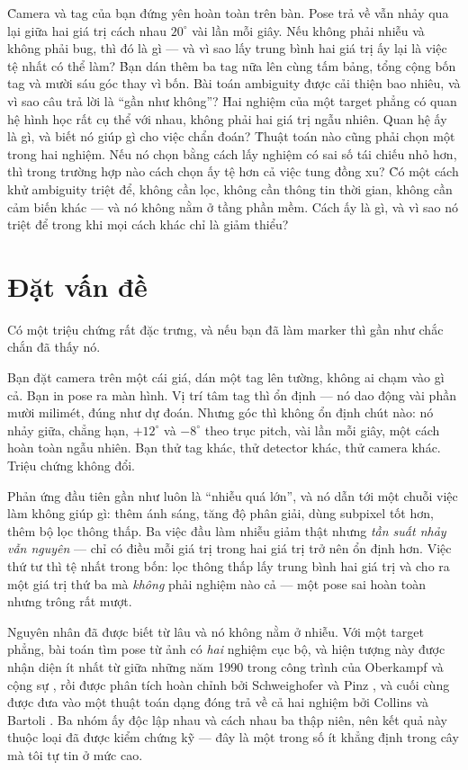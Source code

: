 \documentclass[../../marker.tex]{subfiles}
\begin{document}
\begin{khoigoi}
\h{Camera và tag của bạn đứng yên hoàn toàn trên bàn. Pose trả về vẫn nhảy qua lại giữa hai giá trị cách nhau \(20^\circ\) vài lần mỗi giây. Nếu không phải nhiễu và không phải bug, thì đó là gì --- và vì sao lấy trung bình hai giá trị ấy lại là việc tệ nhất có thể làm?}
\h{Bạn dán thêm ba tag nữa lên cùng tấm bảng, tổng cộng bốn tag và mười sáu góc thay vì bốn. Bài toán ambiguity được cải thiện bao nhiêu, và vì sao câu trả lời là ``gần như không''?}
\h{Hai nghiệm của một target phẳng có quan hệ hình học rất cụ thể với nhau, không phải hai giá trị ngẫu nhiên. Quan hệ ấy là gì, và biết nó giúp gì cho việc chẩn đoán?}
\h{Thuật toán nào cũng phải chọn một trong hai nghiệm. Nếu nó chọn bằng cách lấy nghiệm có sai số tái chiếu nhỏ hơn, thì trong trường hợp nào cách chọn ấy tệ hơn cả việc tung đồng xu?}
\h{Có một cách khử ambiguity triệt để, không cần lọc, không cần thông tin thời gian, không cần cảm biến khác --- và nó không nằm ở tầng phần mềm. Cách ấy là gì, và vì sao nó triệt để trong khi mọi cách khác chỉ là giảm thiểu?}
\end{khoigoi}

\section{Đặt vấn đề}

Có một triệu chứng rất đặc trưng, và nếu bạn đã làm marker thì gần như chắc chắn đã thấy nó.

Bạn đặt camera trên một cái giá, dán một tag lên tường, không ai chạm vào gì cả. Bạn in pose ra màn hình. Vị trí tâm tag thì ổn định --- nó dao động vài phần mười milimét, đúng như  dự đoán. Nhưng góc thì không ổn định chút nào: nó nhảy giữa, chẳng hạn, \(+12^\circ\) và \(-8^\circ\) theo trục pitch, vài lần mỗi giây, một cách hoàn toàn ngẫu nhiên. Bạn thử tag khác, thử detector khác, thử camera khác. Triệu chứng không đổi.

Phản ứng đầu tiên gần như luôn là ``nhiễu quá lớn'', và nó dẫn tới một chuỗi việc làm không giúp gì: thêm ánh sáng, tăng độ phân giải, dùng subpixel tốt hơn, thêm bộ lọc thông thấp. Ba việc đầu làm nhiễu giảm thật nhưng \emph{tần suất nhảy vẫn nguyên} --- chỉ có điều mỗi giá trị trong hai giá trị trở nên ổn định hơn. Việc thứ tư thì tệ nhất trong bốn: lọc thông thấp lấy trung bình hai giá trị và cho ra một giá trị thứ ba mà \emph{không} phải nghiệm nào cả --- một pose sai hoàn toàn nhưng trông rất mượt.

Nguyên nhân đã được biết từ lâu và nó không nằm ở nhiễu. Với một target phẳng, bài toán tìm pose từ ảnh có \emph{hai} nghiệm cục bộ, và hiện tượng này được nhận diện ít nhất từ giữa những năm 1990 trong công trình của Oberkampf và cộng sự \cite{oberkampf1996iterative}, rồi được phân tích hoàn chỉnh bởi Schweighofer và Pinz \cite{schweighofer2006robust}, và cuối cùng được đưa vào một thuật toán dạng đóng trả về cả hai nghiệm bởi Collins và Bartoli \cite{collins2014ippe}. Ba nhóm ấy độc lập nhau và cách nhau ba thập niên, nên kết quả này thuộc loại đã được kiểm chứng kỹ --- đây là một trong số ít khẳng định trong cây mà tôi tự tin ở mức cao.
\end{document}
